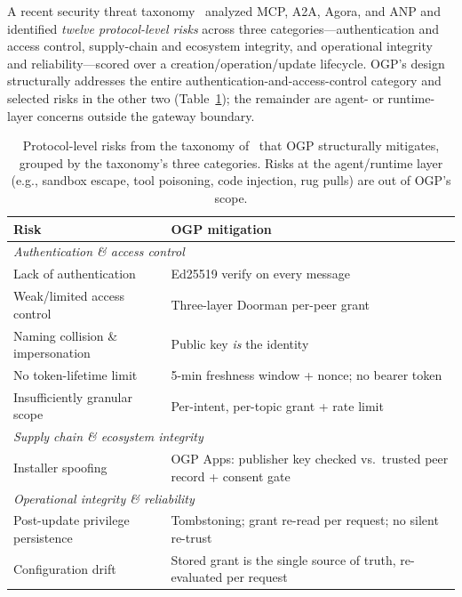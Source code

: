 \documentclass[sigconf,nonacm]{acmart}
\begin{document}
A recent security threat taxonomy~\cite{security2026} analyzed MCP, A2A,
Agora, and ANP and identified \emph{twelve protocol-level risks} across three
categories---authentication and access control, supply-chain and ecosystem
integrity, and operational integrity and reliability---scored over a
creation/operation/update lifecycle. OGP's design structurally addresses the
entire authentication-and-access-control category and selected risks in the
other two (Table~\ref{tab:threats}); the remainder are agent- or runtime-layer
concerns outside the gateway boundary.

\begin{table}[h]
\centering
\caption{Protocol-level risks from the taxonomy of~\cite{security2026} that
OGP structurally mitigates, grouped by the taxonomy's three categories.
Risks at the agent/runtime layer (e.g., sandbox escape, tool poisoning, code
injection, rug pulls) are out of OGP's scope.}
\label{tab:threats}
\small
\begin{tabular}{p{}p{}}
\toprule
Risk & OGP mitigation \\
\midrule
\multicolumn{2}{l}{\textit{Authentication \& access control}} \\
Lack of authentication & Ed25519 verify on every message \\
Weak/limited access control & Three-layer Doorman per-peer grant \\
Naming collision \& impersonation & Public key \emph{is} the identity \\
No token-lifetime limit & 5-min freshness window + nonce; no bearer token \\
Insufficiently granular scope & Per-intent, per-topic grant + rate limit \\
\midrule
\multicolumn{2}{l}{\textit{Supply chain \& ecosystem integrity}} \\
Installer spoofing & OGP Apps: publisher key checked vs.\ trusted peer record + consent gate \\
\midrule
\multicolumn{2}{l}{\textit{Operational integrity \& reliability}} \\
Post-update privilege persistence & Tombstoning; grant re-read per request; no silent re-trust \\
Configuration drift & Stored grant is the single source of truth, re-evaluated per request \\
\bottomrule
\end{tabular}
\end{table}
\end{document}
